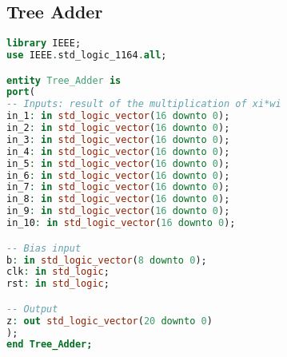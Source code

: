 \subsection{Tree Adder}
\begin{lstlisting}[language=VHDL]
library IEEE;
use IEEE.std_logic_1164.all;

entity Tree_Adder is
port(
-- Inputs: result of the multiplication of xi*wi
in_1: in std_logic_vector(16 downto 0);
in_2: in std_logic_vector(16 downto 0);
in_3: in std_logic_vector(16 downto 0);
in_4: in std_logic_vector(16 downto 0);
in_5: in std_logic_vector(16 downto 0);
in_6: in std_logic_vector(16 downto 0);
in_7: in std_logic_vector(16 downto 0);
in_8: in std_logic_vector(16 downto 0);
in_9: in std_logic_vector(16 downto 0);
in_10: in std_logic_vector(16 downto 0);

-- Bias input
b: in std_logic_vector(8 downto 0);
clk: in std_logic;
rst: in std_logic;

-- Output
z: out std_logic_vector(20 downto 0)
);
end Tree_Adder;

\end{lstlisting}

